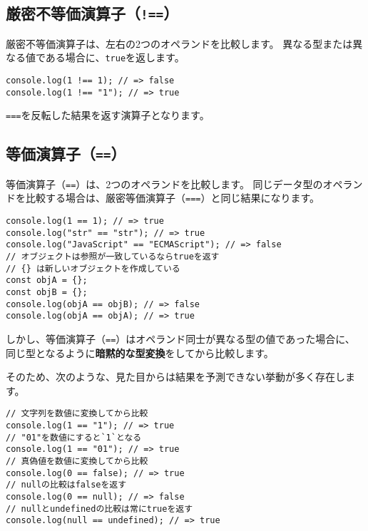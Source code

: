 \hypertarget{strict-not-equal-operator}{%
\subsection{\texorpdfstring{厳密不等価演算子（\texttt{!==}）}{厳密不等価演算子（!==）}}\label{strict-not-equal-operator}}

厳密不等価演算子は、左右の2つのオペランドを比較します。
異なる型または異なる値である場合に、\texttt{true}を返します。

\begin{lstlisting}
console.log(1 !== 1); // => false
console.log(1 !== "1"); // => true
\end{lstlisting}

\texttt{===}を反転した結果を返す演算子となります。

\hypertarget{equal-operator}{%
\subsection{\texorpdfstring{等価演算子（\texttt{==}）}{等価演算子（==）}}\label{equal-operator}}

等価演算子（\texttt{==}）は、2つのオペランドを比較します。
同じデータ型のオペランドを比較する場合は、厳密等価演算子（\texttt{===}）と同じ結果になります。

\begin{lstlisting}
console.log(1 == 1); // => true
console.log("str" == "str"); // => true
console.log("JavaScript" == "ECMAScript"); // => false
// オブジェクトは参照が一致しているならtrueを返す
// {} は新しいオブジェクトを作成している
const objA = {};
const objB = {};
console.log(objA == objB); // => false
console.log(objA == objA); // => true
\end{lstlisting}

しかし、等価演算子（\texttt{==}）はオペランド同士が異なる型の値であった場合に、
同じ型となるように\textbf{暗黙的な型変換}をしてから比較します。

そのため、次のような、見た目からは結果を予測できない挙動が多く存在します。

\begin{lstlisting}
// 文字列を数値に変換してから比較
console.log(1 == "1"); // => true
// "01"を数値にすると`1`となる
console.log(1 == "01"); // => true
// 真偽値を数値に変換してから比較
console.log(0 == false); // => true
// nullの比較はfalseを返す
console.log(0 == null); // => false
// nullとundefinedの比較は常にtrueを返す
console.log(null == undefined); // => true
\end{lstlisting}

